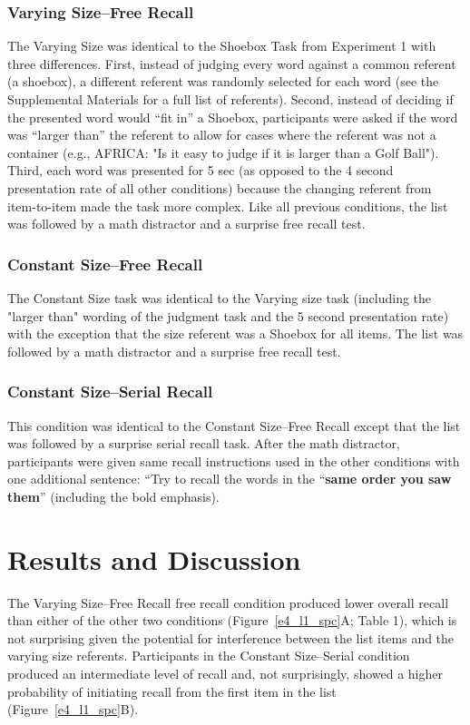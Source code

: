 \documentclass[man,natbib,floatsintext]{apa6} %
\begin{document}
\subsubsection{Varying Size--Free Recall}
The Varying Size  was identical to the Shoebox Task from Experiment 1 with three differences. First, instead of judging every word against a common referent (a shoebox), a different referent was randomly selected for each word (see the Supplemental Materials for a full list of referents). Second, instead of deciding if the presented word would ``fit in'' a Shoebox, participants were asked if the word was ``larger than'' the referent to allow for cases where the referent was not a container (e.g., AFRICA: "Is it easy to judge if it is larger than a Golf Ball"). Third, each word was presented for 5 sec (as opposed to the 4 second presentation rate of all other conditions) because the changing referent from item-to-item made the task more complex. Like all previous conditions, the list was followed by a math distractor and a surprise free recall test.


\subsubsection{Constant Size--Free Recall}
The Constant Size task was identical to the Varying size task (including the "larger than" wording of the judgment task and the 5 second presentation rate) with the exception that the size referent was a Shoebox for all items. The list was followed by a math distractor and a surprise free recall test.

\subsubsection{Constant Size--Serial Recall} 
This condition was identical to the Constant Size--Free Recall except that the list was followed by a surprise serial recall task. After the math distractor, participants were given same recall instructions used in the other conditions with one additional sentence: ``Try to recall the words in the ``\textbf{same order you saw them}'' (including the bold emphasis).

\section{Results and Discussion}

The Varying Size--Free Recall free recall condition produced lower overall recall than either of the other two conditions (Figure~\ref{e4_l1_spc}A; Table 1), which is not surprising given the potential for interference between the list items and the varying size referents. Participants in the Constant Size--Serial condition produced an intermediate level of recall and, not surprisingly, showed a higher probability of initiating recall from the first item in the list (Figure~\ref{e4_l1_spc}B). 
\end{document}
